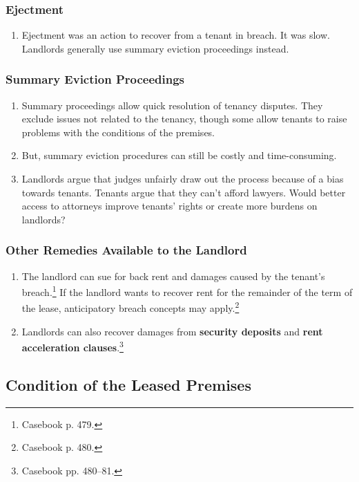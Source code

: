 \subsubsection{Ejectment}

\begin{enumerate}
    \item Ejectment was an action to recover from a tenant in breach. It was 
    slow. Landlords generally use summary eviction proceedings instead.
\end{enumerate}

\subsubsection{Summary Eviction Proceedings} 

\begin{enumerate}
    \item Summary proceedings allow quick resolution of tenancy disputes. They 
    exclude issues not related to the tenancy, though some allow tenants to 
    raise problems with the conditions of the premises.
    \item But, summary eviction procedures can still be costly and 
    time-consuming.
    \item Landlords argue that judges unfairly draw out the process because of 
    a bias towards tenants. Tenants argue that they can't afford lawyers.  
    Would better access to attorneys improve tenants' rights or create more 
    burdens on landlords?
\end{enumerate}

\subsubsection{Other Remedies Available to the Landlord}

\begin{enumerate}
    \item The landlord can sue for back rent and damages caused by the 
    tenant's breach.\footnote{Casebook p. 479.} If the landlord wants to 
    recover rent for the remainder of the term of the lease, anticipatory 
    breach concepts may apply.\footnote{Casebook p. 480.}
    \item Landlords can also recover damages from \textbf{security deposits} 
    and \textbf{rent acceleration clauses}.\footnote{Casebook pp. 480--81.}
\end{enumerate}

\subsection{Condition of the Leased Premises}

